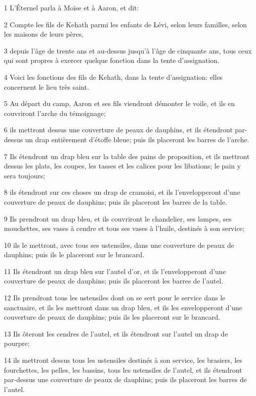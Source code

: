 \par 1 L'Éternel parla à Moïse et à Aaron, et dit:
\par 2 Compte les fils de Kehath parmi les enfants de Lévi, selon leurs familles, selon les maisons de leurs pères,
\par 3 depuis l'âge de trente ans et au-dessus jusqu'à l'âge de cinquante ans, tous ceux qui sont propres à exercer quelque fonction dans la tente d'assignation.
\par 4 Voici les fonctions des fils de Kehath, dans la tente d'assignation: elles concernent le lieu très saint.
\par 5 Au départ du camp, Aaron et ses fils viendront démonter le voile, et ils en couvriront l'arche du témoignage;
\par 6 ils mettront dessus une couverture de peaux de dauphins, et ils étendront par-dessus un drap entièrement d'étoffe bleue; puis ils placeront les barres de l'arche.
\par 7 Ils étendront un drap bleu sur la table des pains de proposition, et ils mettront dessus les plats, les coupes, les tasses et les calices pour les libations; le pain y sera toujours;
\par 8 ils étendront sur ces choses un drap de cramoisi, et ils l'envelopperont d'une couverture de peaux de dauphins; puis ils placeront les barres de la table.
\par 9 Ils prendront un drap bleu, et ils couvriront le chandelier, ses lampes, ses mouchettes, ses vases à cendre et tous ses vases à l'huile, destinés à son service;
\par 10 ils le mettront, avec tous ses ustensiles, dans une couverture de peaux de dauphins; puis ils le placeront sur le brancard.
\par 11 Ils étendront un drap bleu sur l'autel d'or, et ils l'envelopperont d'une couverture de peaux de dauphins; puis ils placeront les barres de l'autel.
\par 12 Ils prendront tous les ustensiles dont on se sert pour le service dans le sanctuaire, et ils les mettront dans un drap bleu, et ils les envelopperont d'une couverture de peaux de dauphins; puis ils les placeront sur le brancard.
\par 13 Ils ôteront les cendres de l'autel, et ils étendront sur l'autel un drap de pourpre;
\par 14 ils mettront dessus tous les ustensiles destinés à son service, les brasiers, les fourchettes, les pelles, les bassins, tous les ustensiles de l'autel, et ils étendront par-dessus une couverture de peaux de dauphins; puis ils placeront les barres de l'autel.

